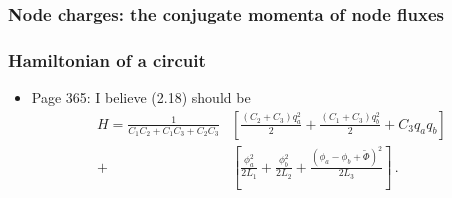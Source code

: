\subsubsection{Node charges: the conjugate momenta of node fluxes}

\subsubsection{Hamiltonian of a circuit}

\begin{itemize}

\item Page 365: I believe (2.18) should be
\begin{align}
H = \frac{1}{C_1 C_2 + C_1 C_3 + C_2 C_3} & \left[
\frac{(C_2 + C_3) q_a^2}{2}
+ \frac{(C_1 + C_3)q_b^2}{2}
+ C_3 q_a q_b \right] \nonumber \\
+ & \left[
\frac{\phi_a^2}{2 L_1} + \frac{\phi_b^2}{2 L_2} + \frac{(\phi_a - \phi_b + \tilde{\Phi})^2}{2 L_3} \right] \nonumber \, .
\end{align}

\end{itemize}
